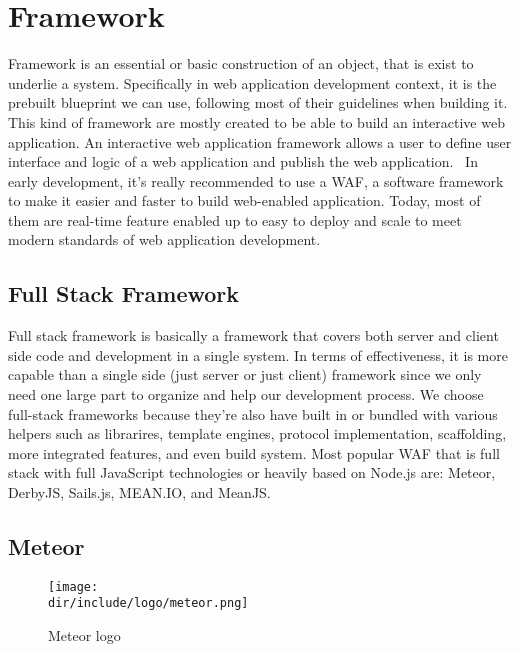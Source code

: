 \section{Framework}
\label{sec:framework}

Framework is an essential or basic construction of an object, that is exist to underlie a system.
Specifically in web application development context, it is the prebuilt blueprint we can use, following most of their guidelines when building it.
This kind of framework are mostly created to be able to build an interactive web application.
An interactive web application framework allows a user to define user interface and logic of a web application and publish the web application.~\autocite{Addala:2013:InteractiveWebAppFramework}
In early development, it's really recommended to use a \ac{WAF}, a software framework to make it easier and faster to build web-enabled application.
Today, most of them are real-time feature enabled up to easy to deploy and scale to meet modern standards of web application development.

\subsection{Full Stack Framework}
\label{ssec:fullstack-framework}

Full stack framework is basically a framework that covers both server and client side code and development in a single system.
In terms of effectiveness, it is more capable than a single side (just server or just client) framework since we only need one large part to organize and help our development process.
We choose full-stack frameworks because they're also have built in or bundled with various helpers such as librarires, template engines, protocol implementation, scaffolding, more integrated features, and even build system.
Most popular \ac{WAF} that is full stack with full JavaScript technologies or heavily based on Node.js are: Meteor, DerbyJS, Sails.js, MEAN.IO, and MeanJS.

\subsection{Meteor}
\label{ssec:meteor}

\begin{wrapfigure}{r}{0.5\textwidth}
  \vspace{-20pt}
  \begin{center}
    \texttt{[image: \\dir/include/logo/meteor.png]}
  \end{center}
  \vspace{-20pt}
  \caption{Meteor logo}
  \label{fig:meteor-logo}
  \vspace{-10pt}
\end{wrapfigure}

